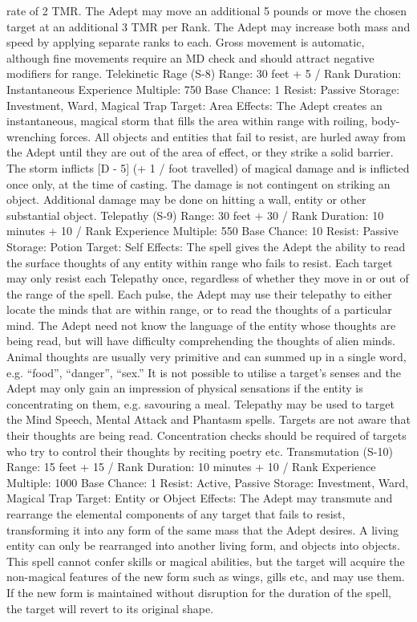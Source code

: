 \documentclass[a4paper]{article}
\begin{document}
\begin{multicols}{3}
rate of 2 TMR. The Adept may move an additional
5 pounds or move the chosen target at an additional
3 TMR per Rank. The Adept may increase both
mass and speed by applying separate ranks to each.
Gross movement is automatic, although fine
movements require an MD check and should attract negative modifiers for range.
Telekinetic Rage (S-8)
Range: 30 feet + 5 / Rank
Duration: Instantaneous
Experience Multiple: 750
Base Chance: 1%
Resist: Passive
Storage: Investment, Ward, Magical Trap
Target: Area
Effects: The Adept creates an instantaneous, magical storm that fills the area within range with roiling, body-wrenching forces. All objects and entities that fail to resist, are hurled away from the
Adept until they are out of the area of effect, or
they strike a solid barrier.
The storm inflicts [D - 5] (+ 1 / foot travelled) of
magical damage and is inflicted once only, at the
time of casting. The damage is not contingent on
striking an object. Additional damage may be done
on hitting a wall, entity or other substantial object.
Telepathy (S-9)
Range: 30 feet + 30 / Rank
Duration: 10 minutes + 10 / Rank
Experience Multiple: 550
Base Chance: 10%
Resist: Passive
Storage: Potion
Target: Self
Effects: The spell gives the Adept the ability to
read the surface thoughts of any entity within range
who fails to resist. Each target may only resist each
Telepathy once, regardless of whether they move
in or out of the range of the spell.
Each pulse, the Adept may use their telepathy to
either locate the minds that are within range, or to
read the thoughts of a particular mind. The Adept
need not know the language of the entity whose
thoughts are being read, but will have difficulty
comprehending the thoughts of alien minds. Animal thoughts are usually very primitive and can
summed up in a single word, e.g. “food”, “danger”,
“sex.”
It is not possible to utilise a target’s senses and the
Adept may only gain an impression of physical
sensations if the entity is concentrating on them,
e.g. savouring a meal.
Telepathy may be used to target the Mind Speech,
Mental Attack and Phantasm spells.
Targets are not aware that their thoughts are being
read. Concentration checks should be required of
targets who try to control their thoughts by reciting
poetry etc.
Transmutation (S-10)
Range: 15 feet + 15 / Rank
Duration: 10 minutes + 10 / Rank
Experience Multiple: 1000
Base Chance: 1%
Resist: Active, Passive
Storage: Investment, Ward, Magical Trap
Target: Entity or Object
Effects: The Adept may transmute and rearrange
the elemental components of any target that fails to
resist, transforming it into any form of the same
mass that the Adept desires. A living entity can
only be rearranged into another living form, and
objects into objects. This spell cannot confer skills
or magical abilities, but the target will acquire the
non-magical features of the new form such as
wings, gills etc, and may use them. If the new form
is maintained without disruption for the duration of
the spell, the target will revert to its original shape.


\end{multicols}
\end{document}
